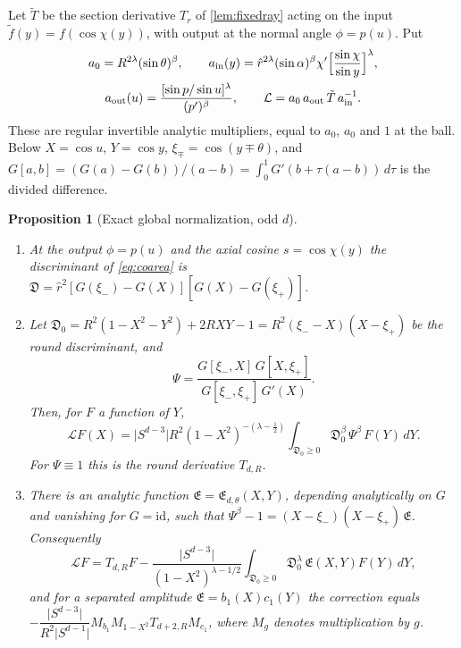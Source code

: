 \documentclass[11pt]{amsart}
\numberwithin{equation}{section}
\newtheorem{proposition}[theorem]{Proposition}
\theoremstyle{definition}
\theoremstyle{remark}
\newcommand{\abs}[1]{\lvert #1\rvert}
\newcommand{\id}{\mathrm{id}}
\newcommand{\Disc}{\mathfrak D}
\begin{document}
Let $\tilde T$ be the section derivative $T_r$ of \cref{lem:fixedray} acting on the input $\tilde f(y)=f(\cos\chi(y))$, with output at the normal angle $\phi=p(u)$. Put
\begin{equation}\label{eq:Lnorm}
\begin{gathered}
a_0=R^{2\lambda}(\sin\theta)^\beta,\qquad a_{\mathrm{in}}(y)=\hat r^{2\lambda}(\sin\alpha)^\beta\chi'\Bigl[\frac{\sin\chi}{\sin y}\Bigr]^\lambda,\\
a_{\mathrm{out}}(u)=\frac{[\sin p/\sin u]^\lambda}{(p')^\beta},\qquad
\mathcal L=a_0\,a_{\mathrm{out}}\,\tilde T\,a_{\mathrm{in}}^{-1}.
\end{gathered}
\end{equation}
These are regular invertible analytic multipliers, equal to $a_0$, $a_0$ and $1$ at the ball. Below $X=\cos u$, $Y=\cos y$, $\xi_\mp=\cos(y\mp\theta)$, and $G[a,b]=(G(a)-G(b))/(a-b)=\int_0^1G'(b+\tau(a-b))\,d\tau$ is the divided difference.

\begin{proposition}[Exact global normalization, odd $d$]\label{prop:oddnorm}
\begin{enumerate}[label=\textup{(\alph*)}]
\item At the output $\phi=p(u)$ and the axial cosine $s=\cos\chi(y)$ the discriminant of \eqref{eq:coarea} is $\Disc=\hat r^2[G(\xi_-)-G(X)][G(X)-G(\xi_+)]$.
\item Let $\Disc_0=R^2(1-X^2-Y^2)+2RXY-1=R^2(\xi_--X)(X-\xi_+)$ be the round discriminant, and
\[
\Psi=\frac{G[\xi_-,X]\,G[X,\xi_+]}{G[\xi_-,\xi_+]\,G'(X)} .
\]
Then, for $F$ a function of $Y$,
\begin{equation}\label{eq:Lkernel}
\mathcal LF(X)=\abs{S^{d-3}}R^2(1-X^2)^{-(\lambda-\frac12)}\int_{\Disc_0\ge0}\Disc_0^{\beta}\,\Psi^\beta\,F(Y)\,dY .
\end{equation}
For $\Psi\equiv1$ this is the round derivative $T_{d,R}$.
\item There is an analytic function $\mathfrak E=\mathfrak E_{d,\theta}(X,Y)$, depending analytically on $G$ and vanishing for $G=\id$, such that $\Psi^\beta-1=(X-\xi_-)(X-\xi_+)\,\mathfrak E$. Consequently
\begin{equation}\label{eq:dd2}
\mathcal LF=T_{d,R}F-\frac{\abs{S^{d-3}}}{(1-X^2)^{\lambda-1/2}}\int_{\Disc_0\ge0}\Disc_0^{\lambda}\,\mathfrak E(X,Y)F(Y)\,dY ,
\end{equation}
and for a separated amplitude $\mathfrak E=b_1(X)c_1(Y)$ the correction equals $-\dfrac{\abs{S^{d-3}}}{R^2\abs{S^{d-1}}}M_{b_1}M_{1-X^2}T_{d+2,R}M_{c_1}$, where $M_g$ denotes multiplication by $g$.
\end{enumerate}
\end{proposition}
\end{document}

